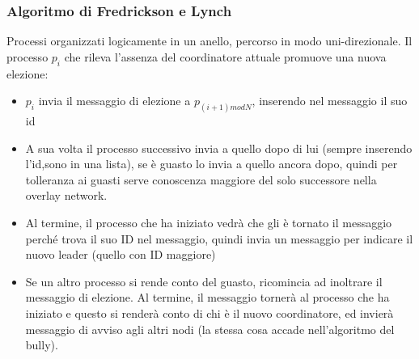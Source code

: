 \documentclass[16px]{article}
\begin{document}
\subsubsection{Algoritmo di Fredrickson e Lynch}
Processi organizzati logicamente in un anello, percorso in modo uni-direzionale. Il processo $p_i$ che rileva l'assenza del coordinatore attuale promuove una nuova elezione:
\begin{itemize}
\item $p_i$ invia il messaggio di elezione a $p_{(i+1)modN}$, inserendo nel messaggio il suo id
\item A sua volta il processo successivo invia a quello dopo di lui (sempre inserendo l'id,sono in una lista), se è guasto lo invia a quello ancora dopo, quindi per tolleranza ai guasti serve conoscenza maggiore del solo successore nella overlay network.
\item Al termine, il processo che ha iniziato vedrà che gli è tornato il messaggio perché trova il suo ID nel messaggio, quindi invia un messaggio per indicare il nuovo leader (quello con ID maggiore)
\item Se un altro processo si rende conto del guasto, ricomincia ad inoltrare il messaggio di elezione. Al termine, il messaggio tornerà al processo che ha iniziato e questo si renderà conto di chi è il nuovo coordinatore, ed invierà messaggio di avviso agli altri nodi (la stessa cosa accade nell'algoritmo del bully).
\end{itemize}
\end{document}
